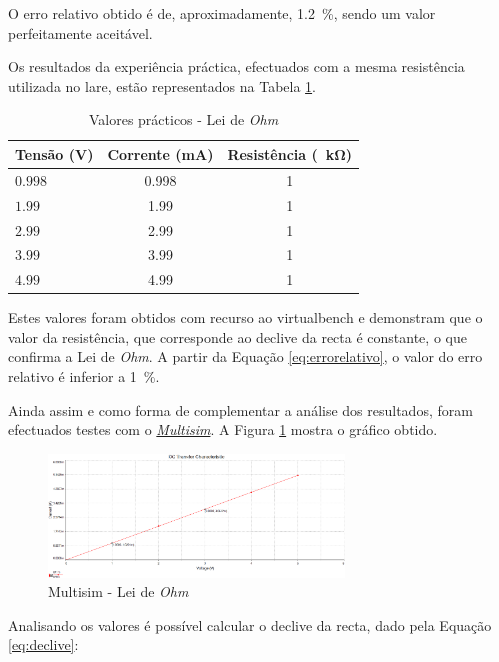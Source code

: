 O erro relativo obtido é de, aproximadamente, \SI{1.2}{\percent}, sendo um valor perfeitamente aceitável.

Os resultados da experiência práctica, efectuados com a mesma resistência utilizada no \acrshort{lare}, estão representados na Tabela \ref{Table:valoresexperimentaisohm}.

\begin{table}[htb]
	\centering
	\caption{Valores prácticos - Lei de \textit{Ohm}} 
	\label{Table:valoresexperimentaisohm}
	\begin{tabular}{lcc}
		\toprule
		Tensão (V)& Corrente (mA) & Resistência (\SI{}{\kilo\ohm}) \\
		\midrule
		$0.998$ & 0.998 & 1  \\
		\midrule
		 $1.99$ & 1.99  & 1  \\
		 \midrule
		 $2.99$ & 2.99  & 1  \\
		 \midrule
		 $3.99$ & 3.99  & 1  \\
		 \midrule
		 $4.99$ & 4.99  & 1  \\
		\bottomrule
	\end{tabular}
\end{table}

Estes valores foram obtidos com recurso ao \acrshort{virtualbench} e demonstram que o valor da resistência, que corresponde ao declive da recta é constante, o que confirma a Lei de \textit{Ohm}. A partir da Equação \ref{eq:errorelativo}, o valor do erro relativo é inferior a \SI{1}{\percent}. 

Ainda assim e como forma de complementar a análise dos resultados, foram efectuados testes com o \href{https://www.multisim.com}{\textit{Multisim}}. A Figura \ref{fig:multisimOHM} mostra o gráfico obtido.

\begin{figure}[hbtp]
	\centering
	\includegraphics[width=0.7\textwidth]{figures/OHM_resultado_multisim.png}
	\caption{Multisim - Lei de \textit{Ohm}}
	\label{fig:multisimOHM}
\end{figure}

Analisando os valores é possível calcular o declive da recta, dado pela Equação \ref{eq:declive}:

